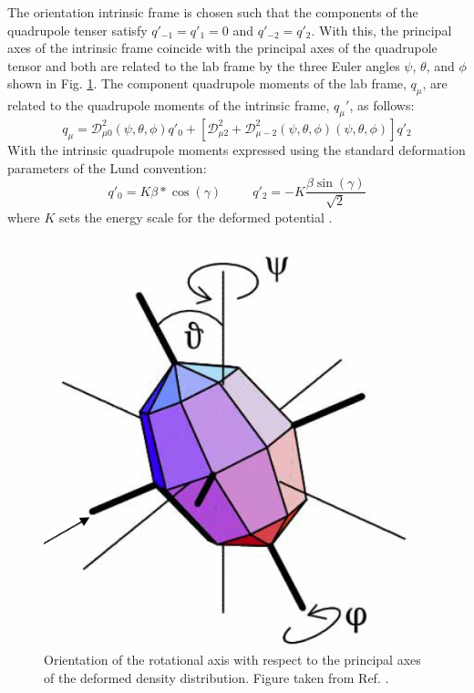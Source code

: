 The orientation intrinsic frame is chosen such that the components of the quadrupole tenser satisfy $q'_{-1}=q'_1=0$ and $q'_{-2}=q'_2$. With this, the principal axes of the intrinsic frame coincide with the principal axes of the quadrupole tensor and both are related to the lab frame by the three Euler angles $\psi$, $\theta$, and $\phi$ shown in Fig. \ref{fig:chp2-TAC-euler-angles}. The component quadrupole moments of the lab frame, $q_{\mu}$, are related to the quadrupole moments of the intrinsic frame, $q_{\mu}'$, as follows:
\begin{equation}
\label{eqn:chp2-intrin-quad-to-lab-quad}
q_{\mu} = \mathcal{D}^2_{\mu{}0}(\psi,\theta,\phi)q'_0+\left[\mathcal{D}^2_{\mu{}2}+\mathcal{D}^2_{\mu{}-2}(\psi,\theta,\phi)(\psi,\theta,\phi)\right]q'_2
\end{equation}
With the intrinsic quadrupole moments expressed using the standard deformation parameters of the Lund convention:
\begin{equation}
\label{eqn:chp2-lund-conv-quad-moments}
q'_0=K\beta{}*\cos(\gamma) ~~~~~~~~~~~ q'_2 = -K\frac{\beta{}\sin(\gamma)}{\sqrt{2}}
\end{equation}
where $K$ sets the energy scale for the deformed potential \cite{frauendorfTAC}.
\begin{figure}[t!]
\centerline{\includegraphics[height=0.3\textheight]{./img/c2/tiltorientation.png}}
	\caption{Orientation of the rotational axis with respect to the principal axes of the deformed density distribution. Figure taken from Ref. \cite{danielDissertation}.\label{fig:chp2-TAC-euler-angles}}
\end{figure}

